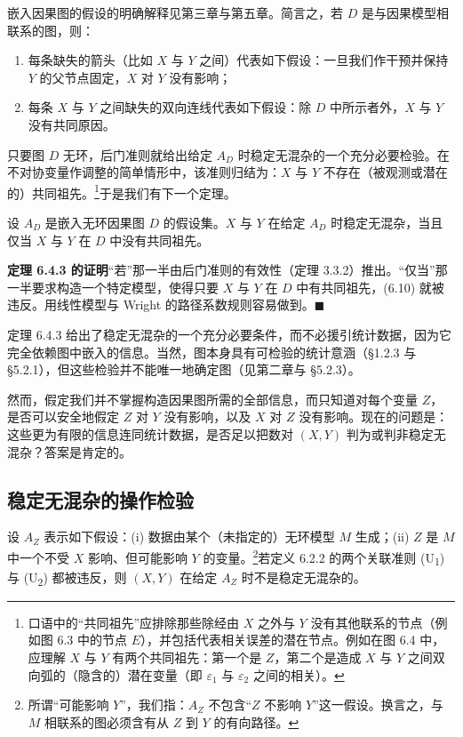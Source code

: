 嵌入因果图的假设的明确解释见第三章与第五章。简言之，若 $D$ 是与因果模型相联系的图，则：
\begin{enumerate}[label=\arabic*.,leftmargin=1.8em]
\item 每条缺失的箭头（比如 $X$ 与 $Y$ 之间）代表如下假设：一旦我们作干预并保持 $Y$ 的父节点固定，$X$ 对 $Y$ 没有影响；
\item 每条 $X$ 与 $Y$ 之间缺失的双向连线代表如下假设：除 $D$ 中所示者外，$X$ 与 $Y$ 没有共同原因。
\end{enumerate}

只要图 $D$ 无环，后门准则就给出给定 $A_D$ 时稳定无混杂的一个充分必要检验。在不对协变量作调整的简单情形中，该准则归结为：$X$ 与 $Y$ 不存在（被观测或潜在的）共同祖先。\footnote{口语中的“共同祖先”应排除那些除经由 $X$ 之外与 $Y$ 没有其他联系的节点（例如图 6.3 中的节点 $E$），并包括代表相关误差的潜在节点。例如在图 6.4 中，应理解 $X$ 与 $Y$ 有两个共同祖先：第一个是 $Z$，第二个是造成 $X$ 与 $Y$ 之间双向弧的（隐含的）潜在变量（即 $\varepsilon_1$ 与 $\varepsilon_2$ 之间的相关）。}于是我们有下一个定理。

\begin{theorem}[共同原因原则]
设 $A_D$ 是嵌入无环因果图 $D$ 的假设集。$X$ 与 $Y$ 在给定 $A_D$ 时稳定无混杂，当且仅当 $X$ 与 $Y$ 在 $D$ 中没有共同祖先。
\end{theorem}

\noindent\textbf{定理 6.4.3 的证明}\quad “若”那一半由后门准则的有效性（定理 3.3.2）推出。“仅当”那一半要求构造一个特定模型，使得只要 $X$ 与 $Y$ 在 $D$ 中有共同祖先，\textup{(6.10)} 就被违反。用线性模型与 Wright 的路径系数规则容易做到。$\blacksquare$

定理 6.4.3 给出了稳定无混杂的一个充分必要条件，而不必援引统计数据，因为它完全依赖图中嵌入的信息。当然，图本身具有可检验的统计意涵（\S 1.2.3 与 \S 5.2.1），但这些检验并不能唯一地确定图（见第二章与 \S 5.2.3）。

然而，假定我们并不掌握构造因果图所需的全部信息，而只知道对每个变量 $Z$，是否可以安全地假定 $Z$ 对 $Y$ 没有影响，以及 $X$ 对 $Z$ 没有影响。现在的问题是：这些更为有限的信息连同统计数据，是否足以把数对 $(X,Y)$ 判为或判非稳定无混杂？答案是肯定的。

\subsection{稳定无混杂的操作检验}

\begin{theorem}[稳定无混杂的准则]
设 $A_Z$ 表示如下假设：(i) 数据由某个（未指定的）无环模型 $M$ 生成；(ii) $Z$ 是 $M$ 中一个不受 $X$ 影响、但可能影响 $Y$ 的变量。\footnote{所谓“可能影响 $Y$”，我们指：$A_Z$ 不包含“$Z$ 不影响 $Y$”这一假设。换言之，与 $M$ 相联系的图必须含有从 $Z$ 到 $Y$ 的有向路径。}若定义 6.2.2 的两个关联准则 (U\textsubscript{1}) 与 (U\textsubscript{2}) 都被违反，则 $(X,Y)$ 在给定 $A_Z$ 时不是稳定无混杂的。
\end{theorem}

